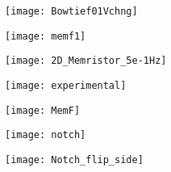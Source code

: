 \begin{figure}[!htp]
\centering
\texttt{[image: Bowtief01Vchng]}
\caption{} 
\label{}
\end{figure}


\begin{figure}[!htp]
\centering
\texttt{[image: memf1]}
\caption{} 
\label{}
\end{figure}


\begin{figure}[!htp]
\centering
\texttt{[image: 2D\_Memristor\_5e-1Hz]}
\caption{} 
\label{}
\end{figure}


\begin{figure}[!htp]
\centering
\texttt{[image: experimental]}
\caption{} 
\label{}
\end{figure}

\begin{figure}[!htp]
\centering
\texttt{[image: MemF]}
\caption{} 
\label{}
\end{figure}

\begin{figure}[!htp]
\centering
\texttt{[image: notch]}
\caption{} 
\label{}
\end{figure}

\begin{figure}[!htp]
\centering
\texttt{[image: Notch\_flip\_side]}
\caption{} 
\label{}
\end{figure}
